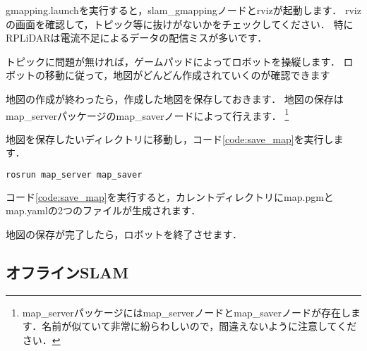 \documentclass[{../../master}]{subfiles}
\begin{document}
\textsf{gmapping.launch}を実行すると，\textsf{slam\_gmapping}ノードと\textsf{rviz}が起動します．
\textsf{rviz}の画面を確認して，トピック等に抜けがないかをチェックしてください．
特にRPLiDARは電流不足によるデータの配信ミスが多いです．

トピックに問題が無ければ，ゲームパッドによってロボットを操縦します．
ロボットの移動に従って，地図がどんどん作成されていくのが確認できます

地図の作成が終わったら，作成した地図を保存しておきます．
地図の保存は\textsf{map\_server}パッケージの\textsf{map\_saver}ノードによって行えます．
\footnote{\textsf{map\_server}パッケージには\textsf{map\_server}ノードと\textsf{map\_saver}ノードが存在します．名前が似ていて非常に紛らわしいので，間違えないように注意してください．}

地図を保存したいディレクトリに移動し，コード\ref{code:save_map}を実行します．

\begin{lstlisting}[language=sh, label=code:save_map, caption=Save Map]
rosrun map_server map_saver
\end{lstlisting}

コード\ref{code:save_map}を実行すると，カレントディレクトリに\textsf{map.pgm}と\textsf{map.yaml}の2つのファイルが生成されます．

地図の保存が完了したら，ロボットを終了させます．

\subsection{オフラインSLAM}
\end{document}

